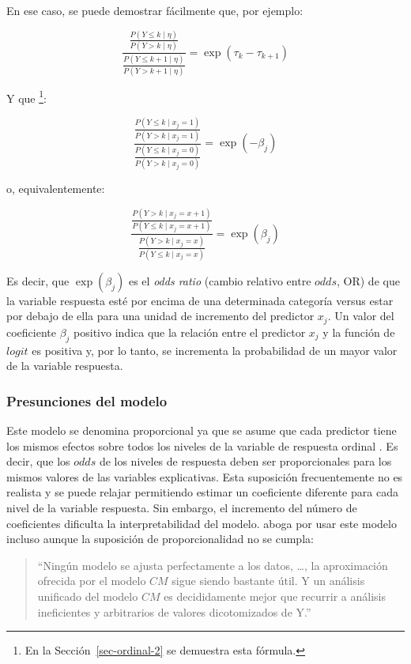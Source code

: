 \documentclass[
  12pt,
  a4paper,
  extrafontsizes,
  onecolumn,
  openright,
  table]{memoir}
\newlength{\rf}
\begin{document}
En ese caso, se puede demostrar fácilmente que, por ejemplo:

\[\frac{\frac{P(Y \leq k \mid \eta)}{P(Y > k \mid \eta)}}{\frac{P(Y \leq k+1 \mid \eta)}{P(Y > k+1 \mid \eta)}} = \exp(\tau_{k} - \tau_{k+1})\]

Y que \footnote{En la Sección~\ref{sec-ordinal-2} se demuestra esta
  fórmula.}:

\[\frac{\frac{P(Y \leq k \mid x_j = 1)}{P(Y > k \mid x_j = 1)}}{\frac{P(Y \leq k \mid x_j=0)}{P(Y > k \mid x_j = 0)}} = \exp(-\beta_{j})\]

o, equivalentemente:

\[\frac{\frac{P(Y > k \mid x_j = x + 1)}{P(Y \leq k \mid x_j = x + 1)}}{\frac{P(Y > k \mid x_j = x)}{P(Y \leq k \mid x_j = x)}} = \exp(\beta_{j})\]

Es decir, que \(\exp(\beta_{j})\) es el \emph{odds ratio} (cambio
relativo entre \(odds\), \gls{OR}) de que la variable respuesta esté por
encima de una determinada categoría versus estar por debajo de ella para
una unidad de incremento del predictor \(x_j\). Un valor del coeficiente
\(\beta_j\) positivo indica que la relación entre el predictor \(x_j\) y
la función de \(logit\) es positiva y, por lo tanto, se incrementa la
probabilidad de un mayor valor de la variable respuesta.

\hypertarget{presunciones-del-modelo}{%
\subsubsection{Presunciones del modelo}\label{presunciones-del-modelo}}

Este modelo se denomina proporcional ya que se asume que cada predictor
tiene los mismos efectos sobre todos los niveles de la variable de
respuesta ordinal \autocite[ver][chap.~5]{Liu2202}. Es decir, que los
\(odds\) de los niveles de respuesta deben ser proporcionales para los
mismos valores de las variables explicativas. Esta suposición
frecuentemente no es realista y se puede relajar permitiendo estimar un
coeficiente diferente para cada nivel de la variable respuesta. Sin
embargo, el incremento del número de coeficientes dificulta la
interpretabilidad del modelo. \textcite{harrell2020} aboga por usar este
modelo incluso aunque la suposición de proporcionalidad no se cumpla:

\begin{quote}
\enquote{Ningún modelo se ajusta perfectamente a los datos, \ldots, la
aproximación ofrecida por el modelo \(CM\) sigue siendo bastante útil. Y
un análisis unificado del modelo \(CM\) es decididamente mejor que
recurrir a análisis ineficientes y arbitrarios de valores dicotomizados
de Y.}
\end{quote}
\end{document}
